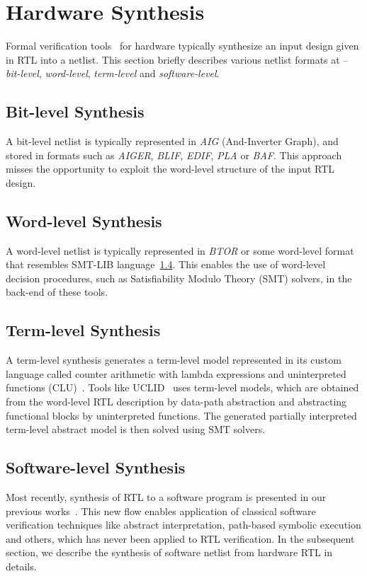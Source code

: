 \section{Hardware Synthesis}\label{sec:abstraction}
%
Formal verification tools~\cite{abc,DBLP:conf/fmcad/BradleyM07,vis} for 
hardware typically synthesize an input design given in RTL into a netlist.  
This section briefly describes various netlist formats at -- \emph{bit-level},
\emph{word-level}, \emph{term-level} and \emph{software-level}.  
%
%
\subsection{Bit-level Synthesis}
A bit-level netlist is typically represented in \emph{AIG} (And-Inverter Graph), 
and stored in formats such as \emph{AIGER}, \emph{BLIF}, 
\emph{EDIF}, \emph{PLA} or \emph{BAF}.  This approach misses 
the opportunity to exploit the word-level structure of the 
input RTL design.  

\subsection{Word-level Synthesis}
A word-level netlist is typically represented in \emph{BTOR} or 
some word-level format that resembles SMT-LIB language~\ref{}.  
This enables the use of word-level decision procedures, such as 
Satisfiability Modulo Theory (SMT) solvers, in the back-end of these tools.  

\subsection{Term-level Synthesis}
A term-level synthesis generates a term-level model represented 
in its custom language called counter arithmetic with lambda 
expressions and uninterpreted functions (CLU)~\cite{uclid}.  Tools 
like UCLID~\cite{uclid} uses term-level models, which are obtained 
from the word-level RTL description by data-path abstraction and 
abstracting functional blocks by uninterpreted functions.  The 
generated partially interpreted term-level abstract model is then 
solved using SMT solvers.  

\subsection{Software-level Synthesis}
Most recently, synthesis of RTL to a software program is presented 
in our previous works~\cite{mkm2015,mtk2016}.  This new flow enables application 
of classical software verification techniques like abstract interpretation, path-based 
symbolic execution and others, which has never been applied to RTL verification.  
In the subsequent section, we describe the synthesis of software netlist 
from hardware RTL in details.     
